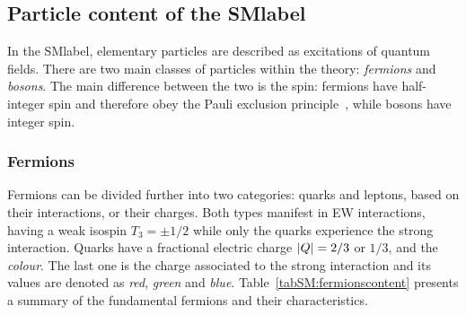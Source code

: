\subsection{Particle content of the \acrlong{SMlabel}}

In the \acrshort{SMlabel}, elementary particles are described as excitations of quantum fields.
There are two main classes of particles within the theory: \textit{fermions} and \textit{bosons}.
The main difference between the two is the spin: fermions have half-integer spin and therefore obey the Pauli exclusion
principle~\cite{Pauli1925}, while bosons have integer spin.

\subsubsection{Fermions}

Fermions can be divided further into two categories: quarks and leptons, based on their interactions, or their charges.
Both types manifest in \acrshort{EW} interactions, having a weak isospin $T_3=\pm1/2$ while only the quarks experience
the strong interaction. Quarks have a fractional electric charge $\abs{Q}=2/3$ or $1/3$, and the \textit{colour}. The last one is the charge associated to the strong interaction and its values are denoted as \textit{red}, \textit{green} and \textit{blue}. Table~\ref{tabSM:fermionscontent} presents a summary of the fundamental fermions and their characteristics.\\

